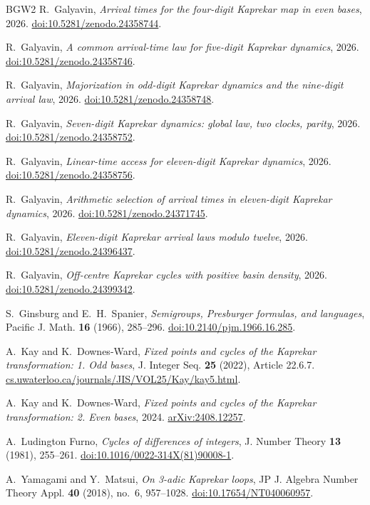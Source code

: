 \documentclass[11pt,reqno]{amsart}
\theoremstyle{definition}
\begin{document}
\begin{thebibliography}{BGW2}
R.~Galyavin, \emph{Arrival times for the four-digit Kaprekar map in even bases}, 2026.
\href{https://doi.org/10.5281/zenodo.24358744}{doi:10.5281/zenodo.24358744}.

R.~Galyavin, \emph{A common arrival-time law for five-digit Kaprekar dynamics}, 2026.
\href{https://doi.org/10.5281/zenodo.24358746}{doi:10.5281/zenodo.24358746}.

R.~Galyavin, \emph{Majorization in odd-digit Kaprekar dynamics and the nine-digit arrival law}, 2026.
\href{https://doi.org/10.5281/zenodo.24358748}{doi:10.5281/zenodo.24358748}.

R.~Galyavin, \emph{Seven-digit Kaprekar dynamics: global law, two clocks, parity}, 2026.
\href{https://doi.org/10.5281/zenodo.24358752}{doi:10.5281/zenodo.24358752}.

R.~Galyavin, \emph{Linear-time access for eleven-digit Kaprekar dynamics}, 2026.
\href{https://doi.org/10.5281/zenodo.24358756}{doi:10.5281/zenodo.24358756}.

R.~Galyavin, \emph{Arithmetic selection of arrival times in eleven-digit Kaprekar dynamics}, 2026.
\href{https://doi.org/10.5281/zenodo.24371745}{doi:10.5281/zenodo.24371745}.

R.~Galyavin, \emph{Eleven-digit Kaprekar arrival laws modulo twelve}, 2026.
\href{https://doi.org/10.5281/zenodo.24396437}{doi:10.5281/zenodo.24396437}.

R.~Galyavin, \emph{Off-centre Kaprekar cycles with positive basin density}, 2026.
\href{https://doi.org/10.5281/zenodo.24399342}{doi:10.5281/zenodo.24399342}.

S.~Ginsburg and E.~H.~Spanier, \emph{Semigroups, Presburger formulas, and
languages}, Pacific J. Math. \textbf{16} (1966), 285--296.
\href{https://doi.org/10.2140/pjm.1966.16.285}{doi:10.2140/pjm.1966.16.285}.

A.~Kay and K.~Downes-Ward, \emph{Fixed points and cycles of the Kaprekar
transformation: 1. Odd bases}, J. Integer Seq. \textbf{25} (2022),
Article 22.6.7.
\href{https://cs.uwaterloo.ca/journals/JIS/VOL25/Kay/kay5.html}{cs.uwaterloo.ca/journals/JIS/VOL25/Kay/kay5.html}.

A.~Kay and K.~Downes-Ward, \emph{Fixed points and cycles of the Kaprekar
transformation: 2. Even bases}, 2024.
\href{https://arxiv.org/abs/2408.12257}{arXiv:2408.12257}.

A.~Ludington Furno, \emph{Cycles of differences of integers},
J. Number Theory \textbf{13} (1981), 255--261.
\href{https://doi.org/10.1016/0022-314X(81)90008-1}{doi:10.1016/0022-314X(81)90008-1}.

A.~Yamagami and Y.~Matsui, \emph{On 3-adic Kaprekar loops},
JP J. Algebra Number Theory Appl. \textbf{40} (2018), no.~6, 957--1028.
\href{https://doi.org/10.17654/NT040060957}{doi:10.17654/NT040060957}.

\end{thebibliography}\endgroup
\end{document}
